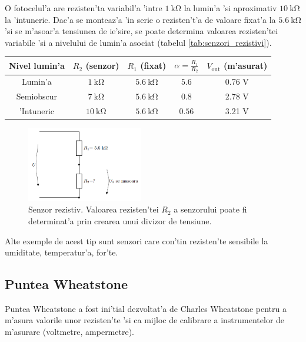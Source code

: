 \begin{example}
O fotocelul'a are rezisten'ta variabil'a 'intre $1~\mathrm{k\Omega}$ la lumin'a 'si aproximativ $10~\mathrm{k\Omega}$ la 'intuneric. Dac'a se monteaz'a 'in serie o rezisten't'a de valoare fixat'a la $5.6~\mathrm{k\Omega}$ 'si se m'asoar'a tensiunea de ie'sire, se poate determina valoarea rezisten'tei variabile 'si a nivelului de lumin'a asociat (tabelul \ref{tab:senzori_rezistivi}).

  \begin{center}
    \begin{tabular}{ccccc}\label{tab:senzori_rezistivi}
      Nivel lumin'a & $R_2$ (senzor) & $R_1$ (fixat) & $\alpha=\frac{R_1}{R_2}$ & $V_\mathrm{out}$ (m'asurat) \\
      \midrule
      Lumin'a & $1~\mathrm{k\Omega}$ &  $5.6~\mathrm{k\Omega}$ & $5.6$ & 0.76 V \\
      Semiobscur &  $7~\mathrm{k\Omega}$ &  $5.6~\mathrm{k\Omega}$ & $0.8$ & 2.78 V \\
      'Intuneric &  $10~\mathrm{k\Omega}$ &  $5.6~\mathrm{k\Omega}$ & $0.56$ & 3.21 V \\
    \end{tabular}
  \end{center}
\end{example}

\begin{figure}[h]
	\centering
		\includegraphics[width=0.45\textwidth]{laborator_01/figuri/6_senzor_rezistiv}
	\caption{Senzor rezistiv. Valoarea rezisten'tei $R_2$ a senzorului poate fi determinat'a prin crearea unui divizor de tensiune.}
	\label{fig:senzor_rezistiv}
\end{figure}

Alte exemple de acest tip sunt senzori care con'tin rezisten'te sensibile la umiditate, temperatur'a, for'te.

\subsection*{Puntea Wheatstone}

Puntea Wheatstone \cite{aplicatii_punte_wheatstone} a fost ini'tial dezvoltat'a de Charles Wheatstone pentru a m'asura valorile unor rezisten'te 'si ca mijloc de calibrare a instrumentelor de m'asurare (voltmetre, ampermetre).

